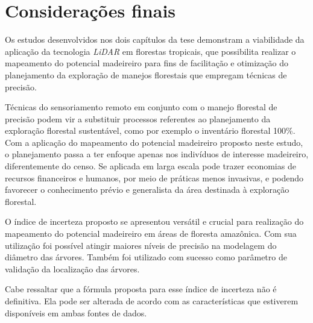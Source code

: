 \documentclass[
	12pt,				%
	openright,			%
	twoside,			%
	a4paper,			%
	chapter=TITLE,		%
	sumario=abnt-6027-2012,
	english,			%
	brazil				%
	]{UFVJM-abntex2}
\newcommand{\li}{\textit{LiDAR }}
\begin{document}




\chapter*{Considerações finais}

Os estudos desenvolvidos nos dois capítulos da tese demonstram a viabilidade da aplicação da tecnologia \li em florestas tropicais, que possibilita  realizar o mapeamento do potencial madeireiro para fins de facilitação e otimização do planejamento da exploração de manejos florestais que empregam técnicas de precisão.

{
Técnicas do sensoriamento remoto em conjunto com o manejo florestal de precisão podem vir a substituir processos referentes ao planejamento da exploração florestal sustentável, como por exemplo o inventário florestal 100\%. Com a aplicação do mapeamento do potencial madeireiro proposto neste estudo, o planejamento passa a ter enfoque apenas nos indivíduos de interesse madeireiro, diferentemente do censo. Se aplicada em larga escala pode trazer economias de recursos financeiros e humanos, por meio de práticas menos invasivas, e podendo favorecer o conhecimento prévio e generalista da área destinada à exploração florestal. 
}

O índice de incerteza proposto se apresentou versátil e crucial para realização do mapeamento do potencial madeireiro em áreas de floresta amazônica. Com sua utilização foi possível atingir maiores níveis de precisão na modelagem do diâmetro das árvores. Também foi utilizado com sucesso como parâmetro de validação da localização das árvores.

Cabe ressaltar que a fórmula proposta para esse índice de incerteza não é definitiva. Ela pode ser alterada de acordo com as características que estiverem disponíveis em ambas fontes de dados.
\end{document}
